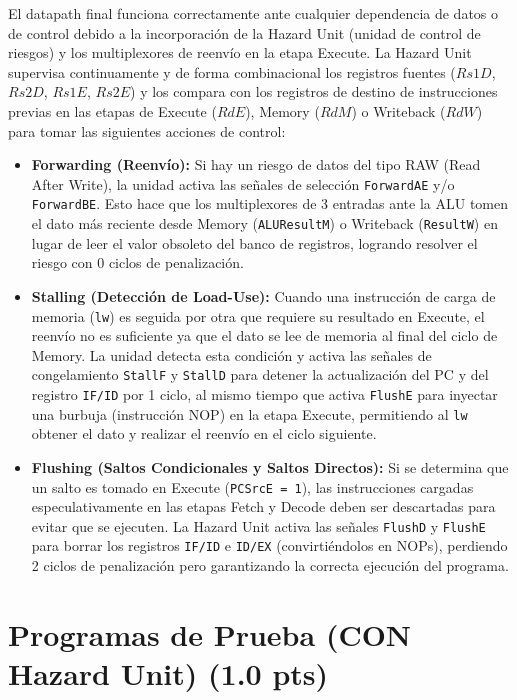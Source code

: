 \documentclass[12pt, a4paper]{article}
\begin{document}
El datapath final funciona correctamente ante cualquier dependencia de datos o de control debido a la incorporación de la Hazard Unit (unidad de control de riesgos) y los multiplexores de reenvío en la etapa Execute. La Hazard Unit supervisa continuamente y de forma combinacional los registros fuentes ($Rs1D$, $Rs2D$, $Rs1E$, $Rs2E$) y los compara con los registros de destino de instrucciones previas en las etapas de Execute ($RdE$), Memory ($RdM$) o Writeback ($RdW$) para tomar las siguientes acciones de control:
\begin{itemize}
    \item \textbf{Forwarding (Reenvío):} Si hay un riesgo de datos del tipo RAW (Read After Write), la unidad activa las señales de selección \texttt{ForwardAE} y/o \texttt{ForwardBE}. Esto hace que los multiplexores de 3 entradas ante la ALU tomen el dato más reciente desde Memory (\texttt{ALUResultM}) o Writeback (\texttt{ResultW}) en lugar de leer el valor obsoleto del banco de registros, logrando resolver el riesgo con 0 ciclos de penalización.
    \item \textbf{Stalling (Detección de Load-Use):} Cuando una instrucción de carga de memoria (\texttt{lw}) es seguida por otra que requiere su resultado en Execute, el reenvío no es suficiente ya que el dato se lee de memoria al final del ciclo de Memory. La unidad detecta esta condición y activa las señales de congelamiento \texttt{StallF} y \texttt{StallD} para detener la actualización del PC y del registro \texttt{IF/ID} por 1 ciclo, al mismo tiempo que activa \texttt{FlushE} para inyectar una burbuja (instrucción NOP) en la etapa Execute, permitiendo al \texttt{lw} obtener el dato y realizar el reenvío en el ciclo siguiente.
    \item \textbf{Flushing (Saltos Condicionales y Saltos Directos):} Si se determina que un salto es tomado en Execute (\texttt{PCSrcE = 1}), las instrucciones cargadas especulativamente en las etapas Fetch y Decode deben ser descartadas para evitar que se ejecuten. La Hazard Unit activa las señales \texttt{FlushD} y \texttt{FlushE} para borrar los registros \texttt{IF/ID} e \texttt{ID/EX} (convirtiéndolos en NOPs), perdiendo 2 ciclos de penalización pero garantizando la correcta ejecución del programa.
\end{itemize}


\section{Programas de Prueba (CON Hazard Unit) (1.0 pts)}
\end{document}
